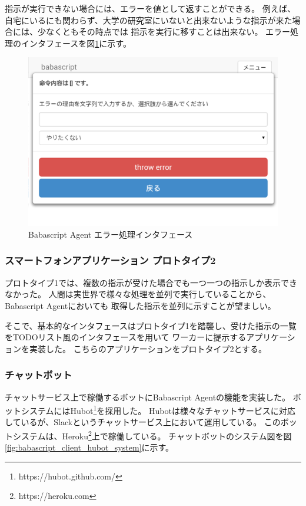 指示が実行できない場合には、エラーを値として返すことができる。
例えば、自宅にいるにも関わらず、大学の研究室にいないと出来ないような指示が来た場合には、少なくともその時点では
指示を実行に移すことは出来ない。
エラー処理のインタフェースを図\ref{fig:throw-error}に示す。

\begin{figure}[htbp]
  \begin{center}
  \includegraphics[width=.5\linewidth,bb=0 0 768 518]{images/throw-error.png}
  \end{center}
  \caption{Babascript Agent エラー処理インタフェース}
  \label{fig:throw-error}
\end{figure}

\subsubsection{スマートフォンアプリケーション
プロトタイプ2}\label{ux30b9ux30deux30fcux30c8ux30d5ux30a9ux30f3ux30a2ux30d7ux30eaux30b1ux30fcux30b7ux30e7ux30f3-ux30d7ux30edux30c8ux30bfux30a4ux30d72}

プロトタイプ1では、複数の指示が受けた場合でも一つ一つの指示しか表示できなかった。
人間は実世界で様々な処理を並列で実行していることから、Babascript
Agentにおいても 取得した指示を並列に示すことが望ましい。

そこで、基本的なインタフェースはプロトタイプ1を踏襲し、受けた指示の一覧をTODOリスト風のインタフェースを用いて
ワーカーに提示するアプリケーションを実装した。
こちらのアプリケーションをプロトタイプ2とする。

\subsubsection{チャットボット}\label{ux30c1ux30e3ux30c3ux30c8ux30dcux30c3ux30c8}

チャットサービス上で稼働するボットにBabascript Agentの機能を実装した。
ボットシステムにはHubot\footnote{https://hubot.github.com/}を採用した。
Hubotは様々なチャットサービスに対応しているが、Slackというチャットサービス上において運用している。
このボットシステムは、Heroku\footnote{https://heroku.com}上で稼働している。
チャットボットのシステム図を図\ref{fig:babascript_client_hubot_system}に示す。

